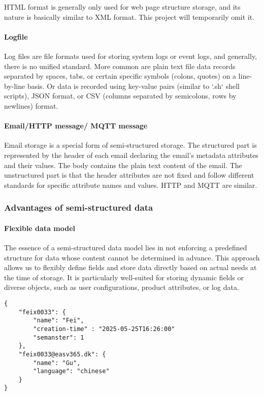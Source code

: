 \documentclass{article}
\begin{document}
HTML format is generally only used for web page structure storage, and its nature is basically similar to XML format. This project will temporarily omit it.

\paragraph{Logfile}
Log files are file formats used for storing system logs or event logs, and generally, there is no unified standard.
More common are plain text file data records separated by spaces, tabs, or certain specific symbols (colons, quotes) on a line-by-line basis. Or data is recorded using key-value pairs (similar to `.sh` shell scripts), JSON format, or CSV (columns separated by semicolons, rows by newlines) format.

\paragraph{Email/HTTP message/ MQTT message}
Email storage is a special form of semi-structured storage. The structured part is represented by the header of each email declaring the email's metadata attributes and their values. The body contains the plain text content of the email. The unstructured part is that the header attributes are not fixed and follow different standards for specific attribute names and values. HTTP and MQTT are similar.

\subsubsection{Advantages of semi-structured data}

\paragraph{Flexible data model}
The essence of a semi-structured data model lies in not enforcing a predefined structure for data whose content cannot be determined in advance. This approach allows us to flexibly define fields and store data directly based on actual needs at the time of storage. It is particularly well-suited for storing dynamic fields or diverse objects, such as user configurations, product attributes, or log data.
\begin{lstlisting}
{
    "feix0033": {
        "name": "Fei",        
        "creation-time" : "2025-05-25T16:26:00"
        "semanster": 1
    },
    "feix0033@easv365.dk": {
        "name": "Gu",
        "language": "chinese"
    }
}
\end{lstlisting}
\end{document}
